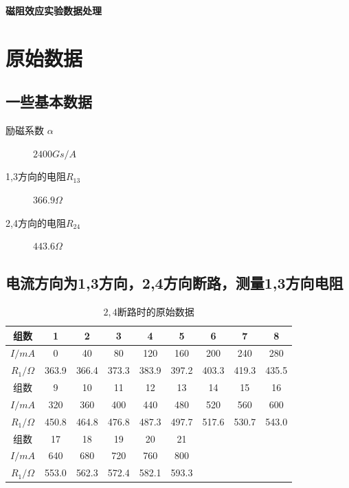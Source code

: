 \documentclass[a4paper,UTF8]{ctexart}
\begin{document}
\begin{center}
    \textbf{\Large 磁阻效应实验数据处理}
    \par {}
\end{center}

\section{原始数据}

\subsection{一些基本数据}

\begin{description}
    \item[励磁系数 $\alpha$] $2400 Gs/A$
    \item[1,3方向的电阻$R_{13}$] $366.9 \Omega$
    \item[2,4方向的电阻$R_{24}$] $443.6 \Omega$
\end{description}

\subsection{电流方向为1,3方向，2,4方向断路，测量1,3方向电阻}

\begin{table}[!ht]
    \centering
    \begin{tabular}{|c|c|c|c|c|c|c|c|c|}
    \hline
        组数 & 1 & 2 & 3 & 4 & 5 & 6 & 7 & 8 \\ \hline
        $I / mA$ & 0 & 40 & 80 & 120 & 160 & 200 & 240 & 280 \\ \hline
        $R_1 / \Omega$ & 363.9 & 366.4 & 373.3 & 383.9 & 397.2 & 403.3 & 419.3 & 435.5 \\ \hline
        组数 & 9 & 10 & 11 & 12 & 13 & 14 & 15 & 16 \\ \hline
        $I / mA$ & 320 & 360 & 400 & 440 & 480 & 520 & 560 & 600 \\ \hline
        $R_1 / \Omega$ & 450.8 & 464.8 & 476.8 & 487.3 & 497.7 & 517.6 & 530.7 & 543.0 \\ \hline
        组数 & 17 & 18 & 19 & 20 & 21 & ~ & ~ & ~ \\ \hline
        $I / mA$ & 640 & 680 & 720 & 760 & 800 & ~ & ~ & ~ \\ \hline
        $R_1 / \Omega$ & 553.0 & 562.3 & 572.4 & 582.1 & 593.3 & ~ & ~ & ~ \\ \hline
    \end{tabular}
    \caption{$2,4$断路时的原始数据}
\end{table}
\end{document}
